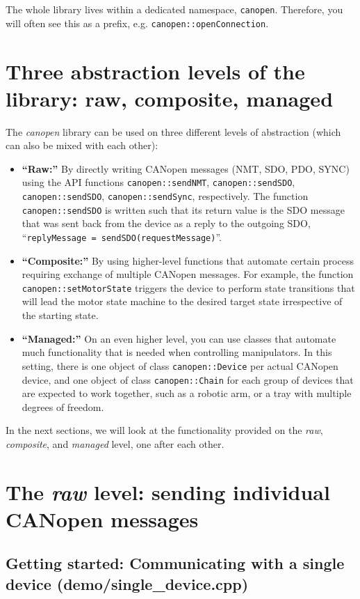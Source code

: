 The whole library lives within a dedicated namespace, \texttt{canopen}. 
Therefore, you will often see this as a prefix, e.g. \texttt{canopen::openConnection}.

\section{Three abstraction levels of the library: raw, composite, managed}

The {\em canopen} library can be used on three different levels of abstraction (which can also be mixed with each other):
\begin{itemize}
\item {\bf ``Raw:''} By directly writing CANopen messages (NMT, SDO, PDO, SYNC) using the API functions \texttt{canopen::sendNMT}, \texttt{canopen::sendSDO}, \texttt{canopen::sendSDO}, \texttt{canopen::sendSync}, respectively. The function \texttt{canopen::sendSDO} is written such that its return value is the SDO message that was sent back from the device as a reply to the outgoing SDO, ``\texttt{replyMessage = sendSDO(requestMessage)}''.
\item {\bf ``Composite:''} By using higher-level functions that automate certain process requiring exchange of multiple CANopen messages. For example, the function \texttt{canopen::setMotorState} triggers the device to perform state transitions that will lead the motor state machine to the desired target state irrespective of the starting state.
\item {\bf ``Managed:''} On an even higher level, you can use classes that automate much functionality that is needed when controlling manipulators. In this setting, there is one object of class \texttt{canopen::Device} per actual CANopen device, and one object of class \texttt{canopen::Chain} for each group of devices that are expected to work together, such as a robotic arm, or a tray with multiple degrees of freedom.
\end{itemize}

In the next sections, we will look at the functionality provided on the {\em raw}, {\em composite}, and {\em managed} level, one after each other.

\section{The {\em raw} level: sending individual CANopen messages}



\subsection{Getting started: Communicating with a single device (demo/single\_device.cpp)}

